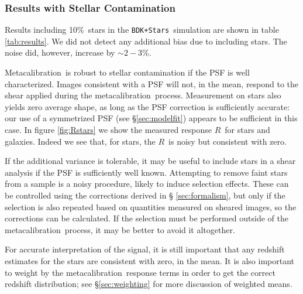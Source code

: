 \documentclass[iop]{emulateapj}
\newcommand{\mcal}{metacalibration}
\newcommand{\Mcal}{Metacalibration}
\newcommand{\mcalR}{\mbox{\boldmath $R$}}
\newcommand{\nsimNStar}{$5.6 \times 10^8$}
\newcommand{\nsimNstarperc}{10\%}
\newcommand{\starnoiseincrease}{$\sim 2-3$\%}
\newcommand{\bdsim}{\texttt{BDK}}
\newcommand{\bdstar}{\texttt{BDK+Stars}}
\begin{document}



\subsubsection{Results with Stellar Contamination} \label{sec:stars}

Results including \nsimNstarperc\ stars in the \bdstar\ simulation are shown in
table \ref{tab:results}. We did not detect any additional bias due to including
stars. The noise did, however, increase by \starnoiseincrease.


\Mcal\ is robust to stellar contamination if the PSF is well
characterized.  Images consistent with a PSF will not, in the mean, respond to the shear
applied during the \mcal\ process.  Measurement on stars also yields zero average shape, as
long as the PSF correction is sufficiently accurate: our use of a symmetrized
PSF (see \S \ref{sec:modelfit}) appears to be sufficient in this case.
In figure \ref{fig:Rstars} we show the measured response \mcalR\ for stars and
galaxies.  Indeed we see that, for stars, the \mcalR\ is noisy but consistent
with zero.

If the additional variance is tolerable, it may be useful to include stars in a
shear analysis if the PSF is sufficiently well known.  Attempting to remove
faint stars from a sample is a noisy procedure, likely to induce selection
effects.  These can be controlled using the corrections derived in \S
\ref{sec:formalism}, but only if the selection is also repeated based on
quantities measured on sheared images, so the corrections can be calculated.
If the selection must be performed outside of the \mcal\ process, it may be
better to avoid it altogether.

For accurate interpretation of the signal, it is still important that any
redshift estimates for the stars are consistent with zero, in the mean. It is
also important to weight by the \mcal\ response terms in order to get the
correct redshift distribution; see \S \ref{sec:weighting} for more
discussion of weighted means.
\end{document}
